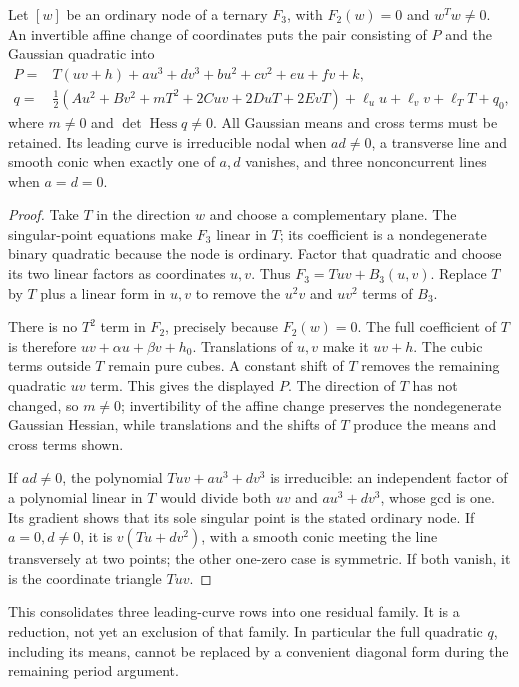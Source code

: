 \begin{lemma}\label{lem:ordinarynormal}
Let $[w]$ be an ordinary node of a ternary $F_3$, with $F_2(w)=0$
and $w^Tw\ne0$. An invertible affine change of coordinates puts
the pair consisting of $P$ and the Gaussian quadratic into
\begin{align*}
 P={}&T(uv+h)+a u^3+d v^3+b u^2+c v^2+e u+f v+k,\\
 q={}&\tfrac12(Au^2+Bv^2+mT^2+2Cuv+2DuT+2EvT)
                  +\ell_u u+\ell_v v+\ell_T T+q_0,
\end{align*}
where $m\ne0$ and $\det\operatorname{Hess}q\ne0$.
All Gaussian means and cross terms must be retained. Its leading
curve is irreducible nodal when $ad\ne0$, a transverse line and
smooth conic when exactly one of $a,d$ vanishes, and three
nonconcurrent lines when $a=d=0$.
\end{lemma}
\begin{proof}
Take $T$ in the direction $w$ and choose a complementary plane.
The singular-point equations make $F_3$ linear in $T$; its
coefficient is a nondegenerate binary quadratic because the node
is ordinary. Factor that quadratic and choose its two linear
factors as coordinates $u,v$. Thus $F_3=Tuv+B_3(u,v)$.
Replace $T$ by $T$ plus a linear form in $u,v$ to remove the
$u^2v$ and $uv^2$ terms of $B_3$.

There is no $T^2$ term in $F_2$, precisely because $F_2(w)=0$.
The full coefficient of $T$ is therefore
$uv+\alpha u+\beta v+h_0$. Translations of $u,v$ make it $uv+h$.
The cubic terms outside $T$ remain pure cubes. A constant shift
of $T$ removes the remaining quadratic $uv$ term. This gives the
displayed $P$. The direction of $T$ has not changed, so $m\ne0$;
invertibility of the affine change preserves the nondegenerate
Gaussian Hessian, while translations and the shifts of $T$ produce
the means and cross terms shown.

If $ad\ne0$, the polynomial $Tuv+a u^3+d v^3$ is irreducible:
an independent factor of a polynomial linear in $T$ would divide
both $uv$ and $a u^3+d v^3$, whose gcd is one. Its gradient shows
that its sole singular point is the stated ordinary node. If
$a=0,d\ne0$, it is $v(Tu+d v^2)$, with a smooth conic meeting
the line transversely at two points; the other one-zero case is
symmetric. If both vanish, it is the coordinate triangle $Tuv$.
\end{proof}

This consolidates three leading-curve rows into one residual family.
It is a reduction, not yet an exclusion of that family. In particular
the full quadratic $q$, including its means, cannot be replaced by
a convenient diagonal form during the remaining period argument.

